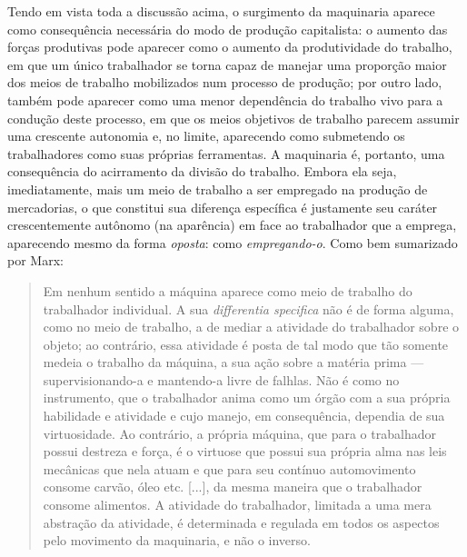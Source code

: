 Tendo em vista toda a discussão acima, o surgimento da maquinaria aparece como consequência necessária do modo de produção capitalista: %
o aumento das forças produtivas pode aparecer como o aumento da produtividade do trabalho, em que um único trabalhador se torna capaz de manejar uma proporção maior dos meios de trabalho mobilizados num processo de produção; por outro lado, também pode aparecer como uma menor dependência do trabalho vivo para a condução deste processo, em que os meios objetivos de trabalho parecem assumir uma crescente autonomia e, no limite, aparecendo como submetendo os trabalhadores como suas próprias ferramentas. 
A maquinaria é, portanto, uma consequência do acirramento da divisão do trabalho. Embora ela seja, imediatamente, mais um meio de trabalho a ser empregado na produção de mercadorias, o que constitui sua diferença específica é justamente seu caráter crescentemente autônomo (na aparência) em face ao trabalhador que a emprega, aparecendo mesmo da forma \textit{oposta}: como \textit{empregando-o}. 
Como bem sumarizado por Marx:
\begin{quote}
    Em nenhum sentido a máquina aparece como meio de trabalho do trabalhador individual. A sua \textit{differentia specifica} não é de forma alguma, como no meio de trabalho, a de mediar a atividade do trabalhador sobre o objeto; ao contrário, essa atividade é posta de tal modo que tão somente medeia o trabalho da máquina, a sua ação sobre a matéria prima --- supervisionando-a e mantendo-a livre de falhlas. Não é como no instrumento, que o trabalhador anima como um órgão com a sua própria habilidade e atividade e cujo manejo, em consequência, dependia de sua virtuosidade. Ao contrário, a própria máquina, que para o trabalhador possui destreza e força, é o virtuose que possui sua própria alma nas leis mecânicas que nela atuam e que para seu contínuo automovimento consome carvão, óleo etc. [...], da mesma maneira que o trabalhador consome alimentos. A atividade do trabalhador, limitada a uma mera abstração da atividade, é determinada e regulada em todos os aspectos pelo movimento da maquinaria, e não o inverso. \parencite[p. 580-1]{Marx2011}
\end{quote}

